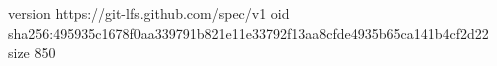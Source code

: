 version https://git-lfs.github.com/spec/v1
oid sha256:495935c1678f0aa339791b821e11e33792f13aa8cfde4935b65ca141b4cf2d22
size 850
